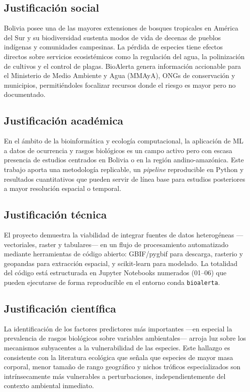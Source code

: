 \documentclass[12pt,a4paper]{article}
\begin{document}
\subsection{Justificación social}

Bolivia posee una de las mayores extensiones de bosques tropicales en América del Sur y su
biodiversidad sustenta modos de vida de decenas de pueblos indígenas y comunidades campesinas.
La pérdida de especies tiene efectos directos sobre servicios ecosistémicos como la regulación
del agua, la polinización de cultivos y el control de plagas.
BioAlerta genera información accionable para el Ministerio de Medio Ambiente y Agua (MMAyA),
ONGs de conservación y municipios, permitiéndoles focalizar recursos donde el riesgo es mayor
pero no documentado.

\subsection{Justificación académica}

En el ámbito de la bioinformática y ecología computacional, la aplicación de ML a datos
de ocurrencia y rasgos biológicos es un campo activo pero con escasa presencia de estudios
centrados en Bolivia o en la región andino-amazónica.
Este trabajo aporta una metodología replicable, un \textit{pipeline} reproducible en Python
y resultados cuantitativos que pueden servir de línea base para estudios posteriores a mayor
resolución espacial o temporal.

\subsection{Justificación técnica}

El proyecto demuestra la viabilidad de integrar fuentes de datos heterogéneas ---vectoriales,
raster y tabulares--- en un flujo de procesamiento automatizado mediante herramientas de código
abierto: GBIF/pygbif para descarga, rasterio y geopandas para extracción espacial, y
scikit-learn para modelado.
La totalidad del código está estructurada en Jupyter Notebooks numerados (01--06) que pueden
ejecutarse de forma reproducible en el entorno conda \texttt{bioalerta}.

\subsection{Justificación científica}

La identificación de los factores predictores más importantes ---en especial la prevalencia
de rasgos biológicos sobre variables ambientales--- arroja luz sobre los mecanismos subyacentes
a la vulnerabilidad de las especies.
Este hallazgo es consistente con la literatura ecológica que señala que especies de mayor masa
corporal, menor tamaño de rango geográfico y nichos tróficos especializados son
intrínsecamente más vulnerables a perturbaciones, independientemente del contexto ambiental
inmediato.
\end{document}
